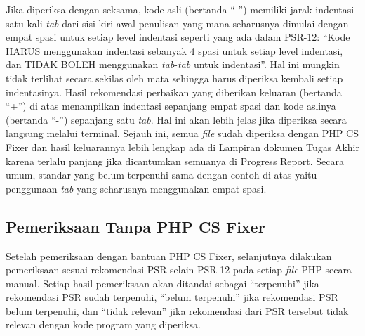 Jika diperiksa dengan seksama, kode asli (bertanda ``-'') memiliki jarak indentasi satu kali \textit{tab} dari sisi kiri awal penulisan yang mana seharusnya dimulai dengan empat spasi untuk setiap level indentasi seperti yang ada dalam PSR-12: ``Kode HARUS menggunakan indentasi sebanyak 4 spasi untuk setiap level indentasi, dan TIDAK BOLEH menggunakan \textit{tab}-\textit{tab} untuk indentasi''. Hal ini mungkin tidak terlihat secara sekilas oleh mata sehingga harus diperiksa kembali setiap indentasinya. Hasil rekomendasi perbaikan yang diberikan keluaran (bertanda ``+'') di atas menampilkan indentasi sepanjang empat spasi dan kode aslinya (bertanda ``-'') sepanjang satu \textit{tab}. Hal ini akan lebih jelas jika diperiksa secara langsung melalui terminal. 
Sejauh ini, semua \textit{file} sudah diperiksa dengan PHP CS Fixer dan hasil keluarannya lebih lengkap ada di Lampiran dokumen Tugas Akhir karena terlalu panjang jika dicantumkan semuanya di Progress Report. Secara umum, standar yang belum terpenuhi sama dengan contoh di atas yaitu penggunaan \textit{tab} yang seharusnya menggunakan empat spasi. 			


\subsection{Pemeriksaan Tanpa PHP CS Fixer}
\label{periksa_manual}
Setelah pemeriksaan dengan bantuan PHP CS Fixer, selanjutnya dilakukan pemeriksaan sesuai rekomendasi PSR selain PSR-12 pada setiap \textit{file} PHP secara manual. Setiap hasil pemeriksaan akan ditandai sebagai ``terpenuhi'' jika rekomendasi PSR sudah terpenuhi, ``belum terpenuhi'' jika rekomendasi PSR belum terpenuhi, dan ``tidak relevan'' jika rekomendasi dari PSR tersebut tidak relevan dengan kode program yang diperiksa.

